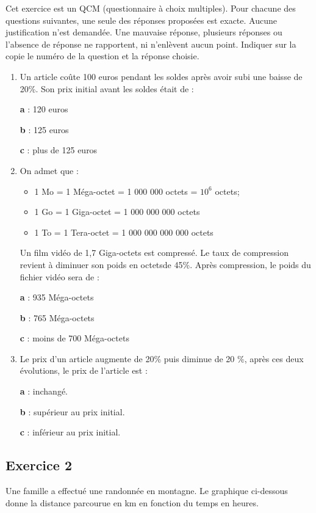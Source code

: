 \documentclass[10pt]{article}
\begin{document}
Cet exercice est un QCM (questionnaire à choix multiples). Pour chacune des questions suivantes, une seule des réponses proposées est exacte. Aucune justification n’est demandée. Une mauvaise réponse, plusieurs réponses ou l’absence de réponse ne rapportent, ni n’enlèvent aucun point. Indiquer sur la copie le numéro de la question et la réponse choisie.

\begin{enumerate}
    \item Un article coûte 100 euros pendant les soldes après avoir subi une baisse de 20\%. Son prix initial avant les soldes était de : 

    \parbox{0.25\linewidth}{\textbf{a} : 120 euros}
    \parbox{0.35\linewidth}{\textbf{b} : 125 euros}
    \parbox{0.35\linewidth}{\textbf{c} : plus de 125 euros}
    \item On admet que :
    \begin{itemize}
        \item 1 Mo = 1 Méga-octet = 1 000 000 octets = $10^6$ octets;
        \item 1 Go = 1 Giga-octet = 1 000 000 000 octets
        \item 1 To = 1 Tera-octet = 1 000 000 000 000 octets
    \end{itemize} 
    Un film vidéo de 1,7 Giga-octets est compressé. Le taux de compression revient à diminuer son poids en octetsde 45\%. Après compression, le poids du fichier vidéo sera de :

    \parbox{0.25\linewidth}{\textbf{a} : 935 Méga-octets}
    \parbox{0.35\linewidth}{\textbf{b} : 765 Méga-octets}
    \parbox{0.35\linewidth}{\textbf{c} : moins de 700 Méga-octets} 
    \item Le prix d’un article augmente de 20\% puis diminue de 20 \%, après ces deux évolutions, le prix de l’article est : 

    \parbox{0.25\linewidth}{\textbf{a} : inchangé.}
    \parbox{0.35\linewidth}{\textbf{b} : supérieur au prix initial.}
    \parbox{0.35\linewidth}{\textbf{c} : inférieur au prix initial.}   
\end{enumerate}


\subsection*{Exercice 2 \hfill }

Une famille a effectué une randonnée en montagne. Le graphique ci-dessous donne la distance parcourue en km en fonction du temps en heures.
\end{document}
